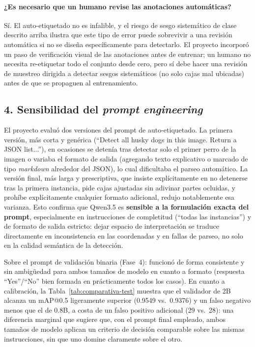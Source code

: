 \documentclass[11pt]{article}
\begin{document}
\paragraph{¿Es necesario que un humano revise las anotaciones automáticas?} Sí. El auto-etiquetado
no es infalible, y el riesgo de sesgo sistemático de clase descrito arriba ilustra que este tipo
de error puede sobrevivir a una revisión automática si no se diseña específicamente para
detectarlo. El proyecto incorporó un paso de verificación visual de las anotaciones antes de
entrenar; un humano no necesita re-etiquetar todo el conjunto desde cero, pero sí debe hacer una
revisión de muestreo dirigida a detectar sesgos sistemáticos (no solo cajas mal ubicadas) antes
de que se propaguen al entrenamiento.

\subsection*{4. Sensibilidad del \textit{prompt engineering}}

El proyecto evaluó dos versiones del prompt de auto-etiquetado. La primera versión, más corta y
genérica (``Detect all husky dogs in this image. Return a JSON list...''), en ocasiones se
detenía tras detectar solo el primer perro de la imagen o variaba el formato de salida
(agregando texto explicativo o marcado de tipo \textit{markdown} alrededor del JSON), lo cual
dificultaba el parseo automático. La versión final, más larga y prescriptiva, que insiste
explícitamente en no detenerse tras la primera instancia, pide cajas ajustadas sin adivinar
partes ocluidas, y prohíbe explícitamente cualquier formato adicional, redujo notablemente esa
varianza. Esto confirma que Qwen3.5 es \textbf{sensible a la formulación exacta del prompt},
especialmente en instrucciones de completitud (``todas las instancias'') y de formato de salida
estricto: dejar espacio de interpretación se traduce directamente en inconsistencia en las
coordenadas y en fallas de parseo, no solo en la calidad semántica de la detección.

Sobre el prompt de validación binaria (Fase~4): funcionó de forma consistente y sin ambigüedad
para ambos tamaños de modelo en cuanto a formato (respuesta ``Yes''/``No'' bien formada en
prácticamente todos los casos). En cuanto a calibración, la Tabla~\ref{tab:comparativa-test}
muestra que el validador de 2B alcanza un mAP@0.5 ligeramente superior (0.9549 vs.\ 0.9376) y un
falso negativo menos que el de 0.8B, a costa de un falso positivo adicional (29 vs.\ 28): una
diferencia marginal que sugiere que, con el prompt final empleado, ambos tamaños de modelo
aplican un criterio de decisión comparable sobre las mismas instrucciones, sin que uno domine
claramente sobre el otro.
\end{document}

